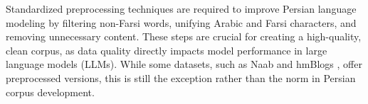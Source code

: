 Standardized preprocessing techniques are required to improve Persian language modeling by filtering non-Farsi words, unifying Arabic and Farsi characters, and removing unnecessary content. These steps are crucial for creating a high-quality, clean corpus, as data quality directly impacts model performance in large language models (LLMs). While some datasets, such as Naab \citep{naab} and hmBlogs \citep{khansari2021hmblogsbiggeneralpersian}, offer preprocessed versions, this is still the exception rather than the norm in Persian corpus development.

